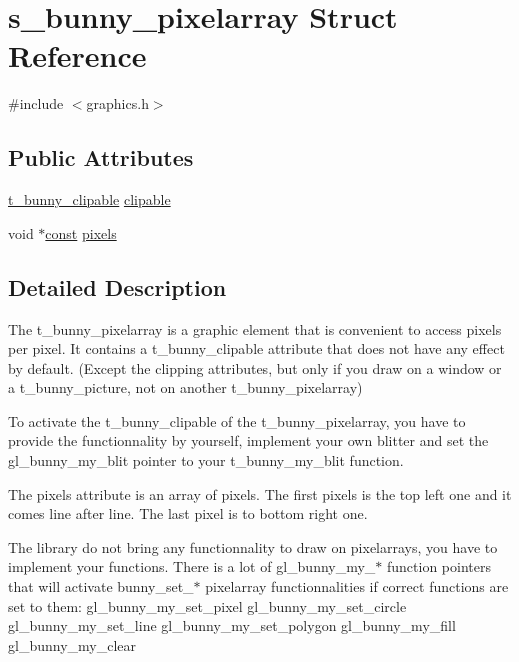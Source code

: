 \hypertarget{structs__bunny__pixelarray}{\section{s\-\_\-bunny\-\_\-pixelarray Struct Reference}
\label{structs__bunny__pixelarray}
}


{\ttfamily \#include $<$graphics.\-h$>$}

\subsection*{Public Attributes}
\begin{DoxyCompactItemize}
\item 
\hyperlink{graphics_8h_aaa6d80d1b603099239f56736e2f24575}{t\-\_\-bunny\-\_\-clipable} \hyperlink{structs__bunny__pixelarray_ac5284a889c44198e7d08fd1e65c94cdf}{clipable}
\item 
void $\ast$\hyperlink{term__entry_8h_a57bd63ce7f9a353488880e3de6692d5a}{const} \hyperlink{structs__bunny__pixelarray_afb3766ff645f84f85ed5db24c7687462}{pixels}
\end{DoxyCompactItemize}


\subsection{Detailed Description}
The t\-\_\-bunny\-\_\-pixelarray is a graphic element that is convenient to access pixels per pixel. It contains a t\-\_\-bunny\-\_\-clipable attribute that does not have any effect by default. (Except the clipping attributes, but only if you draw on a window or a t\-\_\-bunny\-\_\-picture, not on another t\-\_\-bunny\-\_\-pixelarray)

To activate the t\-\_\-bunny\-\_\-clipable of the t\-\_\-bunny\-\_\-pixelarray, you have to provide the functionnality by yourself, implement your own blitter and set the gl\-\_\-bunny\-\_\-my\-\_\-blit pointer to your t\-\_\-bunny\-\_\-my\-\_\-blit function.

The pixels attribute is an array of pixels. The first pixels is the top left one and it comes line after line. The last pixel is to bottom right one.

The library do not bring any functionnality to draw on pixelarrays, you have to implement your functions. There is a lot of gl\-\_\-bunny\-\_\-my\-\_\-$\ast$ function pointers that will activate bunny\-\_\-set\-\_\-$\ast$ pixelarray functionnalities if correct functions are set to them\-: gl\-\_\-bunny\-\_\-my\-\_\-set\-\_\-pixel gl\-\_\-bunny\-\_\-my\-\_\-set\-\_\-circle gl\-\_\-bunny\-\_\-my\-\_\-set\-\_\-line gl\-\_\-bunny\-\_\-my\-\_\-set\-\_\-polygon gl\-\_\-bunny\-\_\-my\-\_\-fill gl\-\_\-bunny\-\_\-my\-\_\-clear


